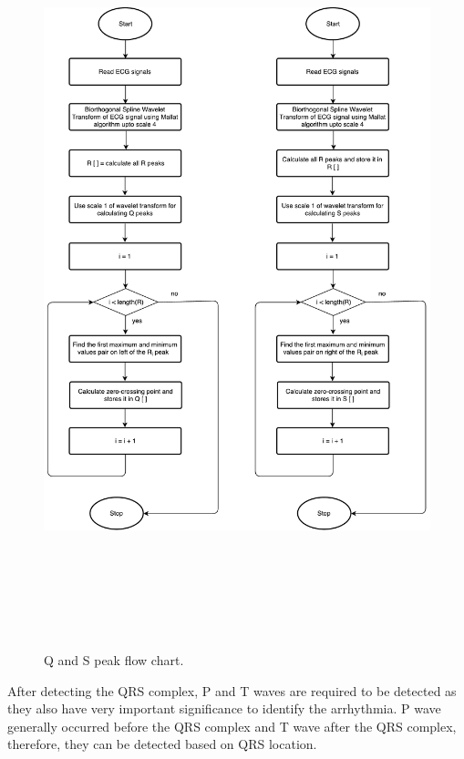 \begin{figure}[htpb]
	\centering
	\includegraphics[width=25cm,height=22cm,keepaspectratio=true]{images/q-and-s.pdf}
	\caption{
		Q and S peak flow chart.
	}
	\label{fig:qs}
\end{figure}



After detecting the QRS complex, P and T waves are required to be detected as they also have very important significance to identify the arrhythmia. P wave generally occurred before the QRS complex and T wave after the QRS complex, therefore, they can be detected based on QRS location.

